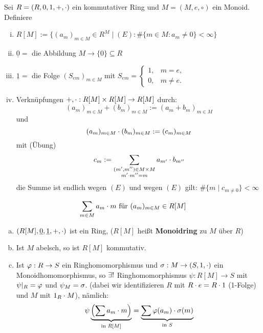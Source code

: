 \documentclass[a4paper]{report}
\begin{document}
\begin{bsp}
  Sei $R = (R, 0, 1, +, \cdot)$ ein kommutativer Ring und $M = (M, e, \circ)$ ein Monoid. Definiere
  \begin{enumerate}[(i)]
    \item $R[M] := \{(a_{m})_{m \in M} \in R^{M} \mid (E): \# \{m \in M : a_{m} \ne 0\} < \infty\}$
    \item $\underline 0 = $ die Abbildung $M \to \{0\} \subseteq R$
    \item $\underline 1 = $ die Folge $(S_{em})_{m \in M}$ mit $S_{em} = \begin{cases} 1, & m = e, \\ 0, & m \ne e.\end{cases}$
    \item Verknüpfungen $+, \cdot : R[M] \times R[M] \to R[M]$ durch:
          \[(a_{m})_{m \in M} + (b_{m})_{m \in M} := (a_{m}+b_{m})_{m \in M}\]
          und
          \[(a_{m})_{m \in M} \cdot (b_{m})_{m \in M} := (c_{m})_{m \in M}\]
          mit (Übung)
          \[c_{m}:= \sum_{\substack{(m', m'') \in M \times M \\ m' \cdot m'' = m}}a_{m'} \cdot b_{m''}\]
          die Summe ist endlich wegen $(E)$ und wegen $(E)$ gilt: $\#\{m \mid c_{m \ne 0}\} < \infty$
  \end{enumerate}
\end{bsp}

\begin{nota*}
\[\sum_{m \in M}a_{m} \cdot m \text{ für } (a_{m})_{m \in M} \in R[M]\]
\end{nota*}

\begin{ubng}\item
\begin{enumerate}[(a)]
  \item $(R[M], \underline 0, \underline 1, +, \cdot)$ ist ein Ring, ($R[M]$ heißt \textbf{Monoidring} zu $M$ über $R$)
  \item Ist $M$ abelsch, so ist $R[M]$  kommutativ.
  \item Ist $\varphi: R \to S$ ein Ringhomomorphismus und $\sigma : M \to (S, 1, \cdot)$ ein Monoidhomomorphismus, so $\exists !$ Ringhomomorphismus $\psi : R[M] \to S$ mit $\psi|_{R} = \varphi$ und $\psi_{M} = \sigma$. (dabei wir identifizieren $R$ mit $R \cdot e = R \cdot 1$ (1-Folge) und $M$ mit $1_{R} \cdot M$), nämlich:
        \[\psi\underbrace{\left(\sum a_{m}\cdot m\right)}_{\text{in }R[M]} = \underbrace{\sum \varphi(a_{m})\cdot \sigma(m)}_{\text{in } S}\]
\end{enumerate}
\end{ubng}
\end{document}
